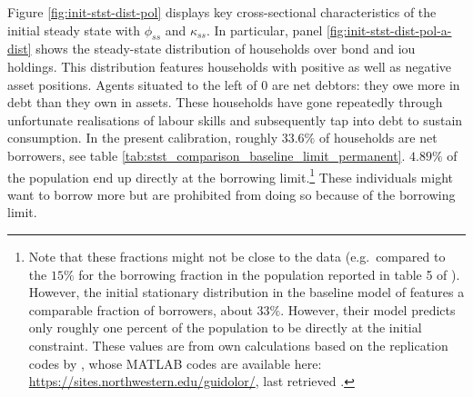 \documentclass[a4paper,12pt]{article} %
\numberwithin{equation}{section} %
\numberwithin{figure}{section}
\numberwithin{table}{section}
\begin{document}
Figure \ref{fig:init-stst-dist-pol} displays key cross-sectional characteristics of the initial steady state with $\phi_{ss}$ and $\kappa_{ss}$. In particular, panel \ref{fig:init-stst-dist-pol-a-dist} shows the steady-state distribution of households over bond and \Gls{iou} holdings. This distribution features households with positive as well as negative asset positions. Agents situated to the left of $0$ are net debtors: they owe more in debt than they own in assets. These households have gone repeatedly through unfortunate realisations of labour skills and subsequently tap into debt to sustain consumption. In the present calibration, roughly $33.6\%$ of households are net borrowers, see table \ref{tab:stst_comparison_baseline_limit_permanent}. $4.89\%$ of the population end up directly at the borrowing limit.\footnote{Note that these fractions might not be close to the data (e.g.~compared to the $15\%$ for the borrowing fraction in the population reported in table 5 of \cite[p.~722]{kaplan2018}). However, the initial stationary distribution in the baseline model of \textcite{gl2017} features a comparable fraction of borrowers, about $33\%$. However, their model predicts only roughly one percent of the population to be directly at the initial constraint. These values are from own calculations based on the replication codes by \textcite{gl2017}, whose MATLAB codes are available here: \url{https://sites.northwestern.edu/guidolor/}, last retrieved .} These individuals might want to borrow more but are prohibited from doing so because of the borrowing limit.
\end{document}
